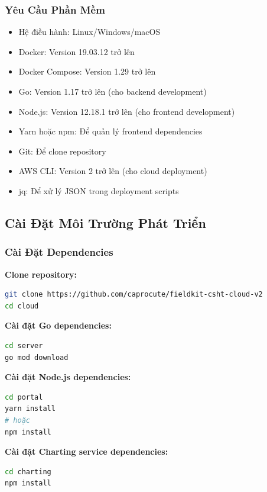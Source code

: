 \subsubsection{Yêu Cầu Phần Mềm}
\begin{itemize}
    \item Hệ điều hành: Linux/Windows/macOS
    \item Docker: Version 19.03.12 trở lên
    \item Docker Compose: Version 1.29 trở lên
    \item Go: Version 1.17 trở lên (cho backend development)
    \item Node.js: Version 12.18.1 trở lên (cho frontend development)
    \item Yarn hoặc npm: Để quản lý frontend dependencies
    \item Git: Để clone repository
    \item AWS CLI: Version 2 trở lên (cho cloud deployment)
    \item jq: Để xử lý JSON trong deployment scripts
\end{itemize}

\subsection{Cài Đặt Môi Trường Phát Triển}

\subsubsection{Cài Đặt Dependencies}

\textbf{Clone repository:}
\begin{lstlisting}[language=bash, caption=Clone repository]
git clone https://github.com/caprocute/fieldkit-csht-cloud-v2
cd cloud
\end{lstlisting}

\textbf{Cài đặt Go dependencies:}
\begin{lstlisting}[language=bash, caption=Cài đặt Go dependencies]
cd server
go mod download
\end{lstlisting}

\textbf{Cài đặt Node.js dependencies:}
\begin{lstlisting}[language=bash, caption=Cài đặt Node.js dependencies]
cd portal
yarn install
# hoặc
npm install
\end{lstlisting}

\textbf{Cài đặt Charting service dependencies:}
\begin{lstlisting}[language=bash, caption=Cài đặt Charting dependencies]
cd charting
npm install
\end{lstlisting}

